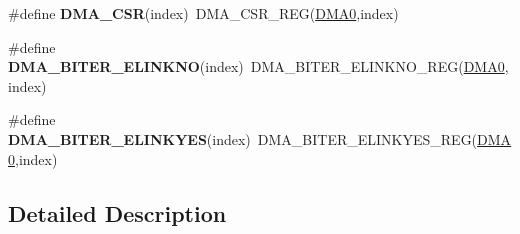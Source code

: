 \begin{DoxyCompactItemize}
\item 
\#define {\bfseries D\+M\+A\+\_\+\+C\+SR}(index)~D\+M\+A\+\_\+\+C\+S\+R\+\_\+\+R\+EG(\hyperlink{group__DMA__Peripheral__Access__Layer_ga4103044f9ca209772f513dc694513ffb}{D\+M\+A0},index)\hypertarget{group__DMA__Register__Accessor__Macros_gafb40df597acc18705ae2b222e2dcfb6b}{}\label{group__DMA__Register__Accessor__Macros_gafb40df597acc18705ae2b222e2dcfb6b}

\item 
\#define {\bfseries D\+M\+A\+\_\+\+B\+I\+T\+E\+R\+\_\+\+E\+L\+I\+N\+K\+NO}(index)~D\+M\+A\+\_\+\+B\+I\+T\+E\+R\+\_\+\+E\+L\+I\+N\+K\+N\+O\+\_\+\+R\+EG(\hyperlink{group__DMA__Peripheral__Access__Layer_ga4103044f9ca209772f513dc694513ffb}{D\+M\+A0},index)\hypertarget{group__DMA__Register__Accessor__Macros_gaecaa21525c6216080d34aee5345f6a79}{}\label{group__DMA__Register__Accessor__Macros_gaecaa21525c6216080d34aee5345f6a79}

\item 
\#define {\bfseries D\+M\+A\+\_\+\+B\+I\+T\+E\+R\+\_\+\+E\+L\+I\+N\+K\+Y\+ES}(index)~D\+M\+A\+\_\+\+B\+I\+T\+E\+R\+\_\+\+E\+L\+I\+N\+K\+Y\+E\+S\+\_\+\+R\+EG(\hyperlink{group__DMA__Peripheral__Access__Layer_ga4103044f9ca209772f513dc694513ffb}{D\+M\+A0},index)\hypertarget{group__DMA__Register__Accessor__Macros_gaaff1ce654846e1e435a07ad784055a98}{}\label{group__DMA__Register__Accessor__Macros_gaaff1ce654846e1e435a07ad784055a98}

\end{DoxyCompactItemize}


\subsection{Detailed Description}
